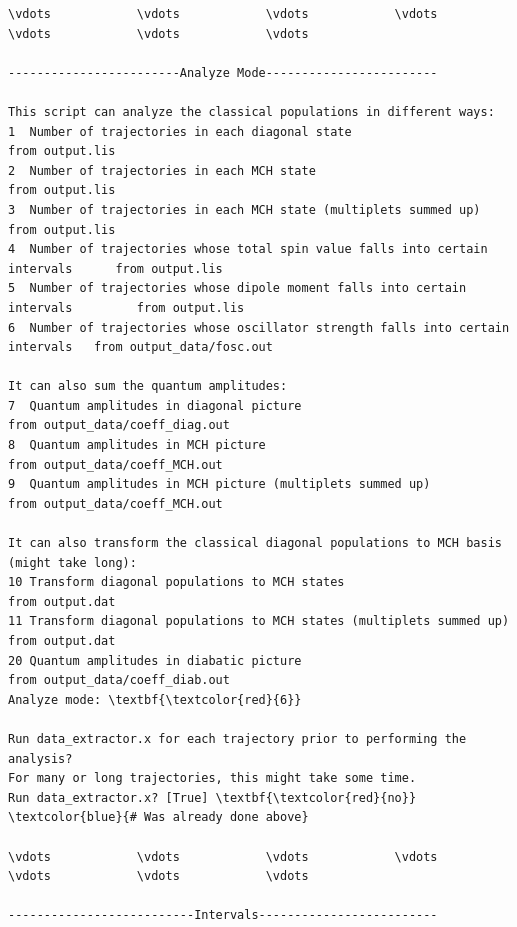 \documentclass[a4paper,11pt,DIV=15,openany]{scrbook}
\begin{document}
\begin{oframed}
\footnotesize\begin{Verbatim}[commandchars=\\\{\}]
\vdots            \vdots            \vdots            \vdots            \vdots            \vdots            \vdots            

------------------------Analyze Mode------------------------

This script can analyze the classical populations in different ways:
1  Number of trajectories in each diagonal state                                   from output.lis
2  Number of trajectories in each MCH state                                        from output.lis
3  Number of trajectories in each MCH state (multiplets summed up)                 from output.lis
4  Number of trajectories whose total spin value falls into certain intervals      from output.lis
5  Number of trajectories whose dipole moment falls into certain intervals         from output.lis
6  Number of trajectories whose oscillator strength falls into certain intervals   from output_data/fosc.out

It can also sum the quantum amplitudes:
7  Quantum amplitudes in diagonal picture                                     from output_data/coeff_diag.out
8  Quantum amplitudes in MCH picture                                          from output_data/coeff_MCH.out
9  Quantum amplitudes in MCH picture (multiplets summed up)                   from output_data/coeff_MCH.out

It can also transform the classical diagonal populations to MCH basis (might take long):
10 Transform diagonal populations to MCH states                               from output.dat
11 Transform diagonal populations to MCH states (multiplets summed up)        from output.dat
20 Quantum amplitudes in diabatic picture                                     from output_data/coeff_diab.out
Analyze mode: \textbf{\textcolor{red}{6}}

Run data_extractor.x for each trajectory prior to performing the analysis?
For many or long trajectories, this might take some time.
Run data_extractor.x? [True] \textbf{\textcolor{red}{no}}          \textcolor{blue}{# Was already done above}

\vdots            \vdots            \vdots            \vdots            \vdots            \vdots            \vdots            

--------------------------Intervals-------------------------


\end{Verbatim}
\end{oframed}
\end{document}
